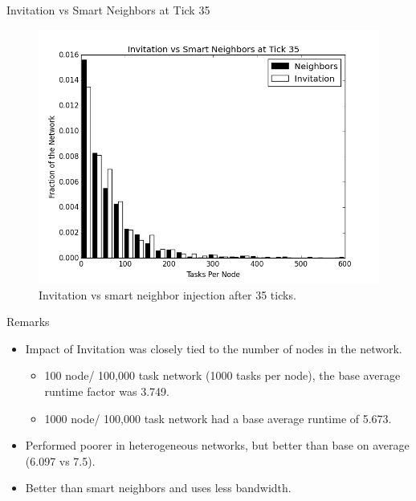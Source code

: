 \documentclass[11pt]{beamer}
\begin{document}




\begin{frame}{Invitation vs Smart Neighbors at Tick 35}

\begin{figure}
	\centering
	\includegraphics[width=0.7\linewidth]{figs/inviteNeighborsHist35}
	\caption[Invitation vs smart neighbor injection after 35 ticks.]{Invitation vs smart neighbor injection after 35 ticks.}
	\label{fig:inviteNeighborsHist35}
\end{figure}

\end{frame}



\begin{frame}{Remarks}
	\begin{itemize}
		\item Impact of Invitation was closely tied to the number of nodes in the network.
		\begin{itemize}
			\item 100 node/ 100,000 task network (1000 tasks per node), the base average runtime factor was 3.749.
			\item 1000 node/ 100,000 task network had a base average runtime of 5.673.
		\end{itemize}
		\item Performed poorer in heterogeneous networks, but better than base on average (6.097 vs 7.5).
		\item Better than smart neighbors and uses less bandwidth.
	\end{itemize}
\end{frame}
\end{document}
